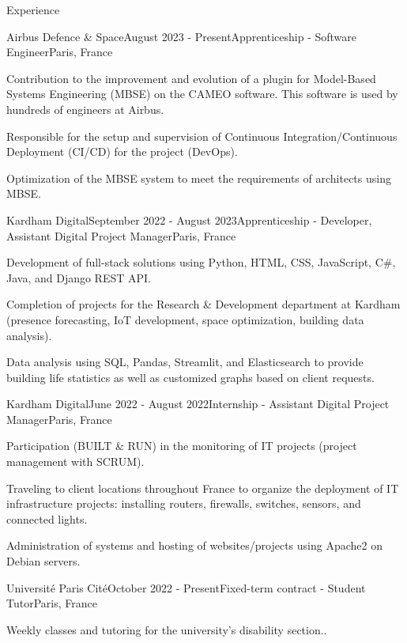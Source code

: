 \documentclass[
	10pt,
]{style} %
\begin{document}
\begin{rSection}{Experience}

	\begin{rSubsection}{Airbus Defence \& Space}{August 2023 - Present}{Apprenticeship - Software Engineer}{Paris, France}
		\item Contribution to the improvement and evolution of a plugin for Model-Based Systems Engineering (MBSE) on the CAMEO software. This software is used by hundreds of engineers at Airbus.
		\item Responsible for the setup and supervision of Continuous Integration/Continuous Deployment (CI/CD) for the project (DevOps).
		\item Optimization of the MBSE system to meet the requirements of architects using MBSE.
	\end{rSubsection}


	\begin{rSubsection}{Kardham Digital}{September 2022 - August 2023}{Apprenticeship - Developer, Assistant Digital Project Manager}{Paris, France}
		\item Development of full-stack solutions using Python, HTML, CSS, JavaScript, C\#, Java, and Django REST API.
		\item Completion of projects for the Research \& Development department at Kardham (presence forecasting, IoT development, space optimization, building data analysis).
		\item Data analysis using SQL, Pandas, Streamlit, and Elasticsearch to provide building life statistics as well as customized graphs based on client requests.
	\end{rSubsection}


	\begin{rSubsection}{Kardham Digital}{June 2022 - August 2022}{Internship - Assistant Digital Project Manager}{Paris, France}
		\item Participation (BUILT \& RUN) in the monitoring of IT projects (project management with SCRUM).
		\item Traveling to client locations throughout France to organize the deployment of IT infrastructure projects: installing routers, firewalls, switches, sensors, and connected lights.
		\item Administration of systems and hosting of websites/projects using Apache2 on Debian servers.
	\end{rSubsection}


	\begin{rSubsection}{Université Paris Cité}{October 2022 - Present}{Fixed-term contract - Student Tutor}{Paris, France}
		\item Weekly classes and tutoring for the university's disability section..
	\end{rSubsection}

\end{rSection}
\end{document}
